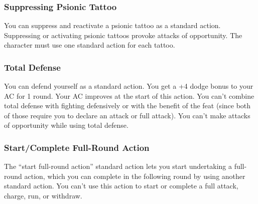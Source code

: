 {\\
\\
\\
}






\subsubsection{Suppressing Psionic Tattoo}
You can suppress and reactivate a psionic tattoo as a standard action. Suppressing or activating psionic tattoos provoke attacks of opportunity. The character must use one standard action for each tattoo.



\subsubsection{Total Defense}
You can defend yourself as a standard action. You get a +4 dodge bonus to your AC for 1 round. Your AC improves at the start of this action. You can't combine total defense with fighting defensively or with the benefit of the  feat (since both of those require you to declare an attack or full attack). You can't make attacks of opportunity while using total defense.

\subsubsection{Start/Complete Full-Round Action}
The ``start full-round action'' standard action lets you start undertaking a full-round action, which you can complete in the following round by using another standard action. You can't use this action to start or complete a full attack, charge, run, or withdraw.